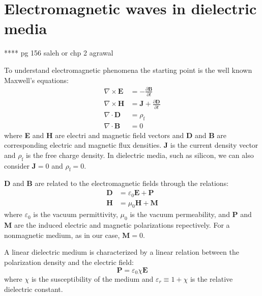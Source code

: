 \documentclass[12pt,a4paper,twoside]{article}
\begin{document}
\section{Electromagnetic waves in dielectric media}

**** 	pg 156 saleh or chp 2 agrawal
\vspace{12pt}

To understand electromagnetic phenomena the starting point is the well known Maxwell's equations:
\begin{subequations}
\begin{align}
	\nabla \times \textbf{E} &= -\frac{\partial \textbf{B}}{\partial t} \\
	\nabla \times \textbf{H} &= \textbf{J} + \frac{\partial \textbf{D}}{\partial t} \\
	\nabla \cdot \textbf{D} &= \rho_{\mathrm{f}} \\
	\nabla \cdot \textbf{B} &= 0
\end{align}
\label{eq_maxwell}
\end{subequations}
where \textbf{E} and \textbf{H} are electri and magnetic field vectors and \textbf{D} and \textbf{B} are corresponding electric and magnetic flux densities. \textbf{J} is the current density vector and $\rho_{\mathrm{f}}$ is the free charge density.
In dielectric media, such as silicon, we can also consider $\textbf{J} = 0$ and $\rho_\mathrm{f} = 0$.

\textbf{D} and \textbf{B} are related to the electromagnetic fields through the relations:
\begin{subequations}
\begin{align}
	\textbf{D} &= \varepsilon_0 \textbf{E} + \textbf{P} \\
	\textbf{H} &= \mu_0 \textbf{H} + \textbf{M}	
\end{align}
\end{subequations}
where $\varepsilon_0$ is the vacuum permittivity, $\mu_0$ is the vacuum permeability, and \textbf{P} and \textbf{M} are the induced electric and magnetic polarizations repectively.
For a nonmagnetic medium, as in our case, $\textbf{M} = 0$.

A linear dielectric medium is characterized by a linear relation between the polarization density and the electric field:
\begin{equation}
\textbf{P} = \varepsilon_0 \chi \textbf{E}
\end{equation}
where $\chi$ is the susceptibility of the medium and $\varepsilon_r \equiv 1+\chi$ is the relative dielectric constant.
\end{document}
